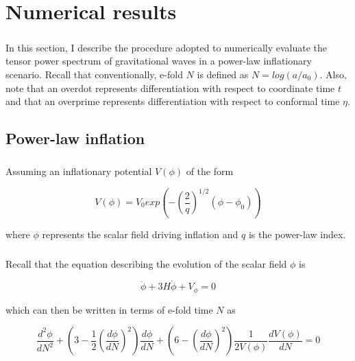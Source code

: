 \documentclass[12pt,a4paper,oneside]{book}
\begin{document}

\chapter{Numerical results}

\paragraph{} In this section, I describe the procedure adopted to numerically evaluate the tensor power spectrum of gravitational waves in a power-law inflationary scenario. Recall that conventionally, e-fold $N$ is defined as $N = log(a/a_0)$. Also, note that an overdot represents differentiation with respect to coordinate time $t$ and that an overprime represents differentiation with respect to conformal time $\eta$.

\section{Power-law inflation}

\paragraph{} Assuming an inflationary potential $V(\phi)$ of the form

\begin{equation}
V(\phi) = V_0 exp(-(\frac{2}{q})^{1/2}(\phi - \phi_0))
\end{equation}

\noindent where $\phi$ represents the scalar field driving inflation and $q$ is the power-law index.

\paragraph*{} Recall that the equation describing the evolution of the scalar field $\phi$ is

\begin{equation}
\ddot{\phi} + 3H\dot{\phi} + V_{\phi} = 0
\end{equation}

\noindent which can then be written in terms of e-fold time $N$ as

\begin{equation}
\frac{d^2\phi}{dN^2} + (3 - \frac{1}{2}(\frac{d\phi}{dN})^2)\frac{d\phi}{dN} + (6 - (\frac{d\phi}{dN})^2)\frac{1}{2V(\phi)}\frac{dV(\phi)}{dN} = 0
\end{equation}
\end{document}
